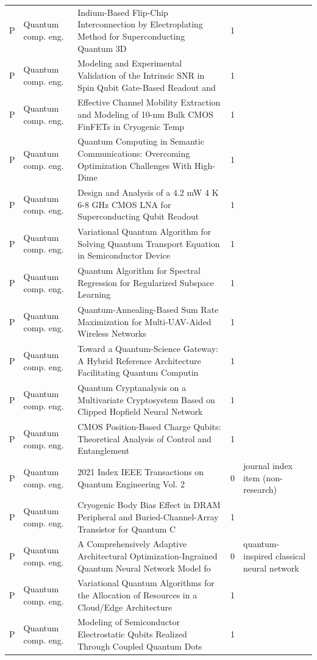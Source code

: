 \documentclass[10pt]{article}
\begin{document}
\begin{longtable}{@{}llL{8.6cm}lL{4.2cm}@{}}
P & Quantum comp. eng. & Indium-Based Flip-Chip Interconnection by Electroplating Method for Superconducting Quantum 3D  & 1 &  \\
P & Quantum comp. eng. & Modeling and Experimental Validation of the Intrinsic SNR in Spin Qubit Gate-Based Readout and  & 1 &  \\
P & Quantum comp. eng. & Effective Channel Mobility Extraction and Modeling of 10-nm Bulk CMOS FinFETs in Cryogenic Temp & 1 &  \\
P & Quantum comp. eng. & Quantum Computing in Semantic Communications: Overcoming Optimization Challenges With High-Dime & 1 &  \\
P & Quantum comp. eng. & Design and Analysis of a 4.2 mW 4 K 6-8 GHz CMOS LNA for Superconducting Qubit Readout & 1 &  \\
P & Quantum comp. eng. & Variational Quantum Algorithm for Solving Quantum Transport Equation in Semiconductor Device & 1 &  \\
P & Quantum comp. eng. & Quantum Algorithm for Spectral Regression for Regularized Subspace Learning & 1 &  \\
P & Quantum comp. eng. & Quantum-Annealing-Based Sum Rate Maximization for Multi-UAV-Aided Wireless Networks & 1 &  \\
P & Quantum comp. eng. & Toward a Quantum-Science Gateway: A Hybrid Reference Architecture Facilitating Quantum Computin & 1 &  \\
P & Quantum comp. eng. & Quantum Cryptanalysis on a Multivariate Cryptosystem Based on Clipped Hopfield Neural Network & 1 &  \\
P & Quantum comp. eng. & CMOS Position-Based Charge Qubits: Theoretical Analysis of Control and Entanglement & 1 &  \\
P & Quantum comp. eng. & 2021 Index IEEE Transactions on Quantum Engineering Vol. 2 & 0 & journal index item (non-research) \\
P & Quantum comp. eng. & Cryogenic Body Bias Effect in DRAM Peripheral and Buried-Channel-Array Transistor for Quantum C & 1 &  \\
P & Quantum comp. eng. & A Comprehensively Adaptive Architectural Optimization-Ingrained Quantum Neural Network Model fo & 0 & quantum-inspired classical neural network \\
P & Quantum comp. eng. & Variational Quantum Algorithms for the Allocation of Resources in a Cloud/Edge Architecture & 1 &  \\
P & Quantum comp. eng. & Modeling of Semiconductor Electrostatic Qubits Realized Through Coupled Quantum Dots & 1 &  \\

\end{longtable}
\end{document}
